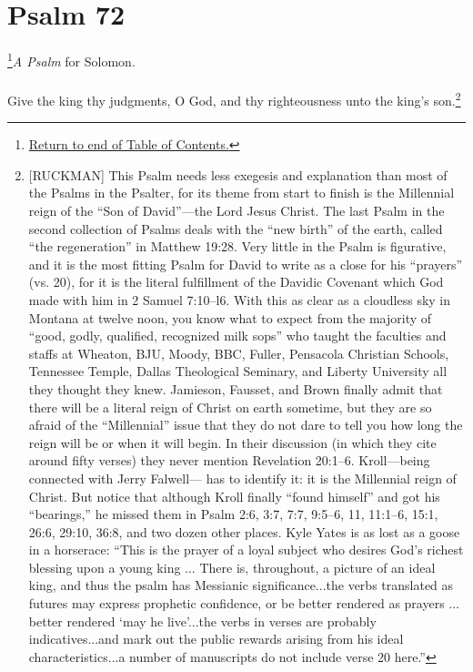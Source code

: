 \chapter{Psalm 72}
\footnote{\textcolor[rgb]{0.00,0.25,0.00}{\hyperlink{TOC}{Return to end of Table of Contents.}}}\textcolor[rgb]{0.00,0.00,1.00}{\emph{A Psalm} for Solomon.}\\
\\
\textcolor[rgb]{0.00,0.00,1.00}{Give the king thy judgments, O God, and thy righteousness unto the king's son.}\footnote{[RUCKMAN] This Psalm needs less exegesis and explanation than most of the Psalms in the Psalter, for its theme from start to finish is the Millennial reign of the “Son of David”—the Lord Jesus Christ. The last Psalm in the second collection of Psalms deals with the “new birth” of the earth, called “the regeneration” in Matthew 19:28. Very little in the Psalm is figurative, and it is the most fitting Psalm for David to write as a close for his “prayers” (vs. 20), for it is the literal fulfillment of the Davidic Covenant which God made with him in 2 Samuel 7:10--l6. With this as clear as a cloudless sky in Montana at twelve noon, you know what to expect from the majority of “good, godly, qualified, recognized milk sops” who taught the faculties and staffs at Wheaton, BJU, Moody, BBC, Fuller, Pensacola Christian Schools, Tennessee Temple, Dallas Theological Seminary, and Liberty University all they thought they knew. Jamieson, Fausset, and Brown finally admit that there will be a literal reign of Christ on earth sometime, but they are so afraid of the “Millennial” issue that they do not dare to tell you how long the reign will be or when it will begin. In their discussion (in which they cite around fifty verses) they never mention Revelation 20:1--6. Kroll—being connected with Jerry Falwell— has to identify it: it is the Millennial reign of Christ. But notice that although Kroll finally “found himself” and got his “bearings,” he missed them in Psalm 2:6, 3:7, 7:7, 9:5--6, 11, 11:1–6, 15:1, 26:6, 29:10, 36:8, and two dozen other places. Kyle Yates is as lost as a goose in a horserace: “This is the prayer of a loyal subject who desires God’s richest blessing upon a young king $\hdots$ There is, throughout, a picture of an ideal king, and thus the psalm has Messianic significance...the verbs translated as futures may express prophetic confidence, or be better rendered as prayers $\hdots$ better rendered ‘may he live’...the verbs in verses are probably indicatives...and mark out the public rewards arising from his ideal characteristics...a number of manuscripts do not include verse 20 here.”\cite{Ruckman1992Psalms}} 
